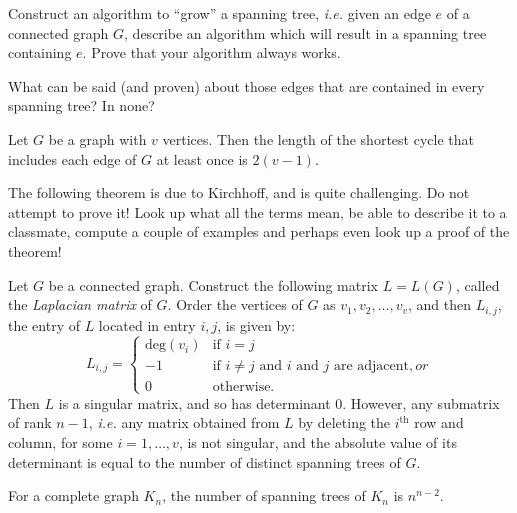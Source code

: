 \begin{exercise} Construct an algorithm to ``grow'' a spanning tree, \textit{i.e.} given an edge $e$ of a connected graph $G$, describe an algorithm which will result in a spanning tree containing $e$.  Prove that your algorithm always works.
\end{exercise}

\begin{exercise} What can be said (and proven) about those edges that are contained in every spanning tree?  In none?
\end{exercise}

\begin{theorem} Let $G$ be a graph with $v$ vertices.  Then the length of the shortest cycle that includes each edge of $G$ at least once is $2(v-1)$.
\end{theorem}

\begin{exercise} The following theorem is due to Kirchhoff, and is quite challenging.  Do not attempt to prove it!  Look up what all the terms mean, be able to describe it to a classmate, compute a couple of examples and perhaps even look up a proof of the theorem!
\end{exercise}

\begin{theorem} Let $G$ be a connected graph.  Construct the following matrix $L=L(G)$, called the \textit{Laplacian matrix} of $G$.  Order the vertices of $G$ as $v_1, v_2, \ldots, v_v$, and then $L_{i,j}$, the entry of $L$ located in entry $i,j$, is given by:
\begin{equation*}
L_{i,j} = \left\{
\begin{array}{ll}
\text{deg}(v_i)& \text{if }i=j\\
-1 & \text{if $i \neq j$ and $i$ and $j$ are adjacent}, or\\
0& \text{otherwise.}
\end{array}
\right.
\end{equation*}
Then $L$ is a singular matrix, and so has determinant 0.  However, any submatrix of rank $n-1$, \textit{i.e.} any matrix obtained from $L$ by deleting the $i^{\text{th}}$ row and column, for some $i=1, \ldots, v$, is not singular, and the absolute value of its determinant is equal to the number of distinct spanning trees of $G$.
\end{theorem}

\begin{corollary} For a complete graph $K_n$, the number of spanning trees of $K_n$ is $n^{n-2}$.
\end{corollary}
